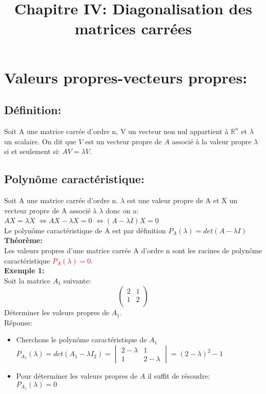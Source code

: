 \documentclass[a4paper,12pt,french]{article}
\date{}
\begin{document}
	
	\title{\textbf{Chapitre IV: Diagonalisation des matrices carrées}}
	\maketitle
	\section{Valeurs propres-vecteurs propres:}
	\subsection{Définition:}
	Soit A une matrice carrée d'ordre n, V un vecteur non nul appartient à $\mathbb{R}^n$ et $\lambda$ un scalaire. On dit que $V$ est un vecteur propre de $A$ associé à la valeur propre $\lambda$ si et seulement si: $AV=\lambda V$.
	\subsection{Polynôme caractéristique:}
	Soit A une matrice carrée d'ordre n. $\lambda$ est une valeur propre de A et X un vecteur propre de A associé à $\lambda$ donc on a:\\
	$AX=\lambda X$
	$\Leftrightarrow $$AX-\lambda X=0$	$\Leftrightarrow $$(A-\lambda I)X=0$\\
	Le polynôme caractéristique de A est par définition $P_{A}(\lambda)=det(A-\lambda I)$\\
	\textbf{Théorème:}\\
	Les valeurs propres d'une matrice carrée A d'ordre n sont les racines de polynôme caractéristique \textcolor{red}{$P_{A}(\lambda)=0$}.\\
	\textbf{Exemple 1:}\\
	Soit la matrice $A_{1}$ suivante:
	\[\begin{pmatrix}
	2 & 1  \\
	1 & 2 \\
	
	\end{pmatrix}\] 
Déterminer les valeurs propres de $A_{1}$.\\
Réponse:
\begin{itemize}
	\item Cherchons le polynôme caractéristique de $A_{1}$\\
	${P_{A_{1}}(\lambda)=det(A_{1}-\lambda I_{2})=\begin{vmatrix}
		
		2-\lambda&1\\
		1&2-\lambda
		\end{vmatrix}=(2-\lambda)^2-1}$ 
	\item Pour déterminer les valeurs propres de $A$ il suffit de résoudre:\\
	$P_{A_{1}}(\lambda)=0$ 
\end{itemize}
\end{document}
